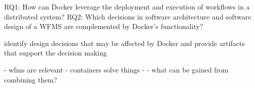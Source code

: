 
RQ1: How can Docker leverage the deployment and execution of workflows in a distributed system?
RQ2: Which decisions in software architecture and software design of a WFMS are complemented by Docker's functionality?

identify design decisions that may be affected by Docker and provide artifacts that support the decision making


  - wfms are relevant
  - containers solve things
  -
  - what can be gained from combining them?



